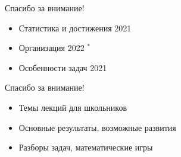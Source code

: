 \documentclass[17pt]{extarticle}
\begin{document}
\newpage \begin{center} \Large Спасибо за внимание! \end{center}

\begin{itemize}
	\item Статистика и достижения 2021
	\item Организация 2022 $^*$
	\item Особенности задач 2021
\end{itemize}

\newpage \begin{center} \Large Спасибо за внимание! \end{center}

\begin{itemize}
	\item Темы лекций для школьников
	\item Основные результаты, возможные развития
	\item Разборы задач, математические игры
\end{itemize}
\end{document}
